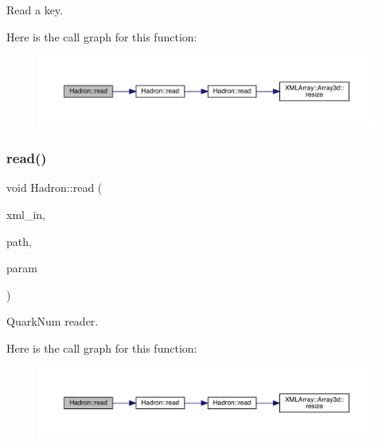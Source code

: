 Read a key. 

Here is the call graph for this function\+:
\nopagebreak
\begin{figure}[H]
\begin{center}
\leavevmode
\includegraphics[width=350pt]{d1/daf/namespaceHadron_ab8d127a4d4a1ca38aae1b0d45226789e_cgraph}
\end{center}
\end{figure}
\mbox{\label{namespaceHadron_a9fc0b61edf5216d1720dabf68810d3b5}} 
\subsubsection{\texorpdfstring{read()}{read()}\hspace{0.1cm}{\footnotesize\ttfamily [7/94]}}
{\footnotesize\ttfamily void Hadron\+::read (\begin{DoxyParamCaption}\item[{\mbox{\hyperlink{classADATXML_1_1XMLReader}{X\+M\+L\+Reader}} \&}]{xml\+\_\+in,  }\item[{const std\+::string \&}]{path,  }\item[{\mbox{\hyperlink{structHadron_1_1QuarkNum__t}{Quark\+Num\+\_\+t}} \&}]{param }\end{DoxyParamCaption})}



Quark\+Num reader. 

Here is the call graph for this function\+:
\nopagebreak
\begin{figure}[H]
\begin{center}
\leavevmode
\includegraphics[width=350pt]{d1/daf/namespaceHadron_a9fc0b61edf5216d1720dabf68810d3b5_cgraph}
\end{center}
\end{figure}
\mbox{\label{namespaceHadron_a4cc74936761dd0dad429189f523b1432}} 
